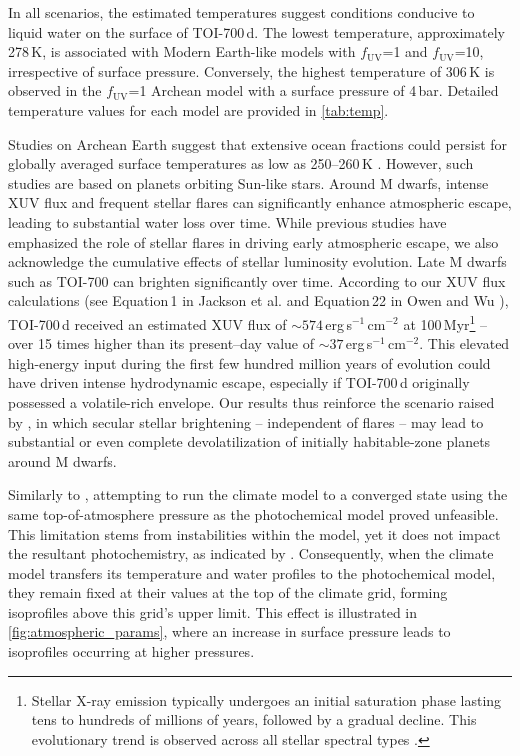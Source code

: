 In all scenarios, the estimated temperatures suggest conditions conducive to liquid water on the surface of TOI-700\,d. The lowest temperature, approximately 278\,K, is associated with Modern Earth-like models with $f_\mathrm{UV}$=1 and $f_\mathrm{UV}$=10, irrespective of surface pressure. Conversely, the highest temperature of 306\,K is observed in the $f_\mathrm{UV}$=1 Archean model with a surface pressure of 4\,bar. Detailed temperature values for each model are provided in \autoref{tab:temp}. 

Studies on Archean Earth suggest that extensive ocean fractions could persist for globally averaged surface temperatures as low as 250–260\,K \citep[e.g.,][]{Wolf2013, Arney.et.al.2016AsBio..16..873A}. However, such studies are based on planets orbiting Sun-like stars. 
Around M dwarfs, intense XUV flux and frequent stellar flares can significantly enhance atmospheric escape, leading to substantial water loss over time. 
While previous studies \citep[e.g.,][]{do.Amaral.et.al.2022ApJ...928...12D} have emphasized the role of stellar flares in driving early atmospheric escape, we also acknowledge the cumulative effects of stellar luminosity evolution. Late M dwarfs such as TOI-700 can brighten significantly over time. According to our XUV flux calculations (see Equation\,1 in Jackson et al. \citeyear{Jackson.et.al.2012MNRAS.422.2024J} and Equation\,22 in Owen and Wu \citeyear{Owen.and.Wu.2017ApJ...847...29O}), TOI-700\,d received an estimated XUV flux of $\sim 574$\,erg\,s$^{-1}$\,cm$^{-2}$ at 100\,Myr\footnote{Stellar X-ray emission typically undergoes an initial saturation phase lasting tens to hundreds of millions of years, followed by a gradual decline. This evolutionary trend is observed across all stellar spectral types \citep{Jackson.et.al.2012MNRAS.422.2024J, Shkolnik.and.Barman.2014AJ....148...64S, McDonald.et.al.2019ApJ...876...22M}.} -- over 15 times higher than its present--day value of $\sim 37$\,erg\,s$^{-1}$\,cm$^{-2}$. This elevated high-energy input during the first few hundred million years of evolution could have driven intense hydrodynamic escape, especially if TOI-700\,d originally possessed a volatile-rich envelope. Our results thus reinforce the scenario raised by \cite{Luger.and.Barnes.2015AsBio..15..119L}, in which secular stellar brightening -- independent of flares -- may lead to substantial or even complete devolatilization of initially habitable-zone planets around M dwarfs.

Similarly to \cite{Meadows.et.al.2018}, attempting to run the climate model to a converged state using the same top-of-atmosphere pressure as the photochemical model proved unfeasible. This limitation stems from instabilities within the model, yet it does not impact the resultant photochemistry, as indicated by \cite{Arney.et.al.2016AsBio..16..873A}. Consequently, when the climate model transfers its temperature and water profiles to the photochemical model, they remain fixed at their values at the top of the climate grid, forming isoprofiles above this grid's upper limit. This effect is illustrated in \autoref{fig:atmospheric_params}, where an increase in surface pressure leads to isoprofiles occurring at higher pressures.

